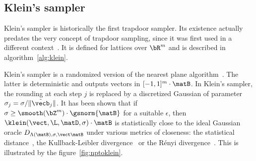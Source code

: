 \subsection{Klein's sampler}\label{sec:ffs:prelim:klein}


Klein's sampler is historically the first trapdoor sampler. Its existence actually predates the very concept of trapdoor sampling, since it was first used in a different context~\cite{SODA:Klein00}. It is defined for lattices over $\bR^m$ and is described in algorithm~\ref{alg:klein}.

 \begin{algorithm}[H]
 \caption{$\klein(\vect, \L, \matD, \sigma)$}
 \label{alg:klein}
 \begin{algorithmic}[1]
 \EndFor
 \Return{$\vecz$}
  \end{algorithmic}
 \end{algorithm}
 Klein's sampler is a randomized version of the nearest plane algorithm~\cite{STACS:Babai85,Combinatorica:Babai86}. The latter is deterministic and outputs vectors in $[-1,1]^m \cdot \matB$. In Klein's sampler, the rounding at each step $j$ is replaced by a discretized Gaussian of parameter $\sigma_j = \sigma/\|\tilde\vecb_j\|$. It has been shown that if $\sigma \geq \smooth(\bZ^m) \cdot \gsnorm{\matB}$ for a suitable $\epsilon$, then $\klein(\vect, \L, \matD, \sigma) \cdot \matB$ is statistically close to the ideal Gaussian oracle $D_{\Lambda(\matB), \sigma, \vect \matB}$ under various metrics of closeness: the statistical distance~\cite{AC:DucNgu12a}, the Kullback-Leibler divergence~\cite{AC:DucLyuPre14} or the R\'enyi divergence~\cite{AC:Prest17}. This is illustrated by the figure~\ref{fig:nptoklein}.


